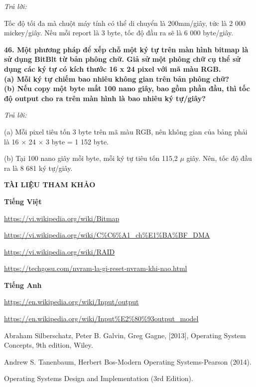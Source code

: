 \documentclass{report}
\begin{document}
\bigskip
\textit{Trả lời:}

\smallskip
Tốc độ tối đa mà chuột máy tính có thể di chuyển là 200mm/giây, tức là 2 000 mickey/giây. Nếu mỗi report là 3 byte, tốc độ đầu ra sẽ là 6 000 byte/giây.

\bigskip
\textbf{46. Một phương pháp để xếp chỗ một ký tự trên màn hình bitmap là sử dụng BitBlt từ bản phông chữ. Giả sử một phông chữ cụ thể sử dụng các ký tự có kích thước 16 x 24 pixel với mã màu RGB.\\
(a) Mỗi ký tự chiếm bao nhiêu không gian trên bản phông chữ?\\
(b) Nếu copy một byte mất 100 nano giây, bao gồm phần đầu, thì tốc độ output cho ra trên màn hình là bao nhiêu ký tự/giây?}

\bigskip
\textit{Trả lời:}

\smallskip
(a) Mỗi pixel tiêu tốn 3 byte trên mã màu RGB, nên không gian của bảng phải là 16 $\times$ 24 $\times$ 3 byte = 1 152 byte.

\smallskip
(b) Tại 100 nano giây mỗi byte, mỗi ký tự tiêu tốn 115,2 $\mu$ giây. Nên, tốc độ đầu ra là 8 681 ký tự/giây.



\newpage
\changefontsizes{16pt}
\centerline{\textbf{TÀI LIỆU THAM KHẢO}}

\vspace{1.2cm}
\changefontsizes{14pt}
\textbf{Tiếng Việt}

\vspace{1cm}
\url{https://vi.wikipedia.org/wiki/Bitmap}

\url{https://vi.wikipedia.org/wiki/C%C6%A1_ch%E1%BA%BF_DMA}

\url{https://vi.wikipedia.org/wiki/RAID}

\url{https://techgosu.com/nvram-la-gi-reset-nvram-khi-nao.html}

\vspace{3cm}
\textbf{Tiếng Anh}

\vspace{1cm}
\url{https://en.wikipedia.org/wiki/Input/output}

\url{https://en.wikipedia.org/wiki/Input%E2%80%93output_model}

\smallskip
Abraham Silberschatz, Peter B. Galvin, Greg Gagne, [2013], Operating System Concepts, 9th edition, Wiley.

Andrew S. Tanenbaum, Herbert Bos-Modern Operating Systems-Pearson (2014).

Operating Systems Design and Implementation (3rd Edition).
\end{document}
